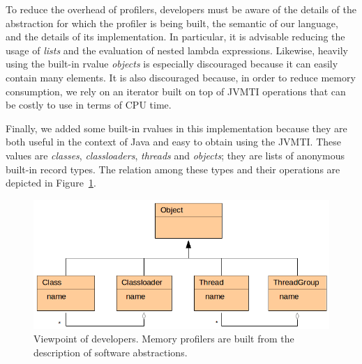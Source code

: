 To reduce the overhead of profilers, developers must be aware of the details of the abstraction for which the profiler is being built, the semantic of our language, and the details of its implementation.
In particular, it is advisable reducing the usage of \textit{lists} and the evaluation of nested lambda expressions.
Likewise, heavily using the built-in rvalue \textit{objects} is especially discouraged because it can easily contain many elements.
It is also discouraged because, in order to reduce memory consumption, we rely on an iterator built on top of JVMTI operations that can be costly to use in terms of CPU time.

Finally, we added some built-in rvalues in this implementation because they are both useful in the context of Java and easy to obtain using the JVMTI.
These values are \textit{classes}, \textit{classloaders}, \textit{threads} and \textit{objects}; they are lists of anonymous built-in record types.
The relation among these types and their operations are depicted in Figure~\ref{fig:dsl-built-in-types}.

\begin{figure}
\centering
\includegraphics[scale=0.45]{./chapter6/fig/diagram-classes.png}
\caption{Viewpoint of developers. Memory profilers are built from the description of software abstractions.}\label{fig:dsl-built-in-types}
\end{figure}


